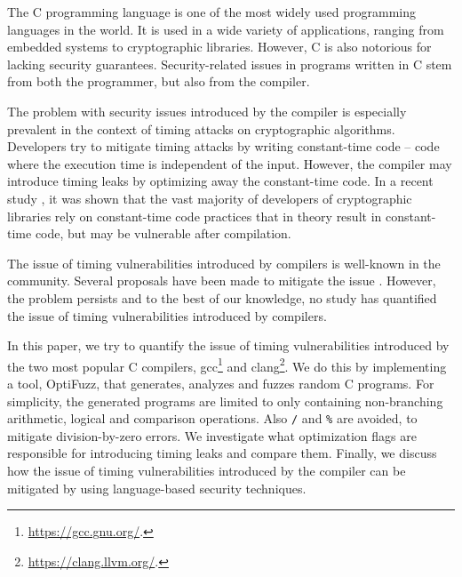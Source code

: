 The C programming language is one of the most widely used programming languages in the world. 
It is used in a wide variety of applications, ranging from embedded systems to cryptographic libraries. 
However, C is also notorious for lacking security guarantees.
Security-related issues in programs written in C stem from both the programmer, but also from the compiler.

The problem with security issues introduced by the compiler is especially prevalent in the context of timing attacks on cryptographic algorithms. 
Developers try to mitigate timing attacks by writing constant-time code -- code where the execution time is independent of the input.
However, the compiler may introduce timing leaks by optimizing away the constant-time code.
In a recent study \citep{developer-survey-timing-attacks}, it was shown that the vast majority of developers of cryptographic libraries rely on constant-time code practices that in theory result in constant-time code, but may be vulnerable after compilation.


The issue of timing vulnerabilities introduced by compilers is well-known in the community.
Several proposals have been made to mitigate the issue \citep{what-you-c, dudect, fact, verified-constant-time-c-comiler}.
However, the problem persists and to the best of our knowledge, no study has quantified the issue of timing vulnerabilities introduced by compilers.

In this paper, we try to quantify the issue of timing vulnerabilities introduced by the two most popular C compilers, gcc\footnote{\url{https://gcc.gnu.org/}.} and clang\footnote{\url{https://clang.llvm.org/}.}.
We do this by implementing a tool, OptiFuzz, that generates, analyzes and fuzzes random C programs.
For simplicity, the generated programs are limited to only containing non-branching arithmetic, logical and comparison operations.
Also \texttt{/} and \texttt{\%} are avoided, to mitigate division-by-zero errors.
We investigate what optimization flags are responsible for introducing timing leaks and compare them.
Finally, we discuss how the issue of timing vulnerabilities introduced by the compiler can be mitigated by using language-based security techniques.

